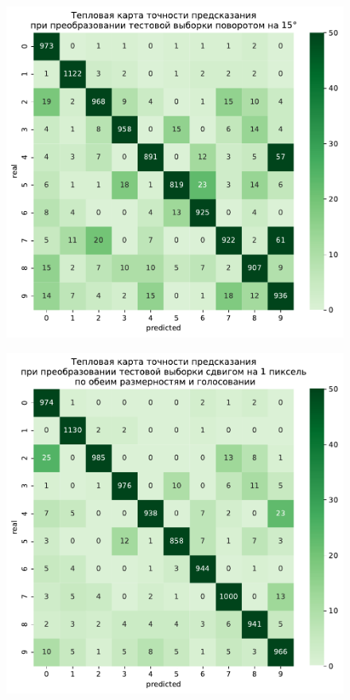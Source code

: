 \documentclass{article}
\begin{document}
\begin{figure}[h]
{\begin{minipage}{8cm}
		\end{minipage}
		\label{app6:rot10}
	}
	\subfigure
	{
		\begin{minipage}{8cm}
			\centering
			\includegraphics[scale=0.35]{TASK1 test rotated15.pdf}
		\end{minipage}
		\label{app6:rot15}
	}
	\subfigure
	{
		\begin{minipage}{8cm}
			\centering
			\includegraphics[scale=0.35]{TASK1 test shift 1 .pdf}

\end{minipage}}
\end{figure}
\end{document}
